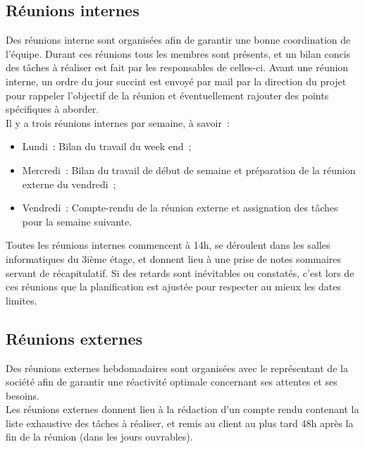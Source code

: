 \documentclass[11pt,fleqn]{report}
\begin{document}
\subsection{Réunions internes}
Des réunions interne sont organisées afin de garantir une bonne coordination de l'équipe.
Durant ces réunions tous les membres sont présents, et un bilan concis des tâches à réaliser est fait par les responsables de celles-ci.
Avant une réunion interne, un ordre du jour succint est envoyé par mail par la direction du projet pour rappeler l'objectif de la réunion et éventuellement rajouter des points spécifiques à aborder.
\\
Il y a trois réunions internes par semaine, à savoir~:
\begin{itemize}
	\item Lundi~: Bilan du travail du week end~;
	\item Mercredi~: Bilan du travail de début de semaine et préparation de la réunion externe du vendredi~;
	\item Vendredi~: Compte-rendu de la réunion externe et assignation des tâches pour la semaine suivante.
\end{itemize}
Toutes les réunions internes commencent à 14h, se déroulent dans les salles informatiques du 3ième étage, et donnent lieu à une prise de notes sommaires servant de récapitulatif.
Si des retards sont inévitables ou constatés, c'est lors de ces réunions que la planification est ajustée pour respecter au mieux les dates limites.

\subsection{Réunions externes}
Des réunions externes hebdomadaires sont organisées avec le représentant de la société afin de garantir une réactivité optimale concernant ses attentes et ses besoins.
\\
Les réunions externes donnent lieu à la rédaction d'un compte rendu contenant la liste exhaustive des tâches à réaliser, et remis au client au plus tard 48h après la fin de la réunion (dans les jours ouvrables).
\end{document}
